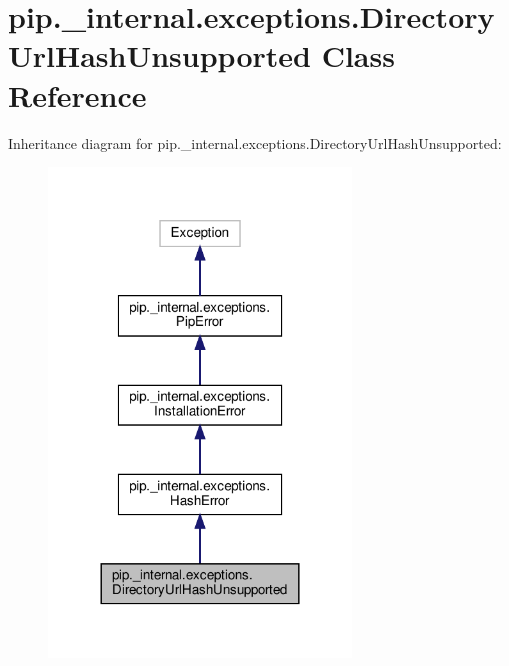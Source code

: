 \hypertarget{classpip_1_1__internal_1_1exceptions_1_1DirectoryUrlHashUnsupported}{}\section{pip.\+\_\+internal.\+exceptions.\+Directory\+Url\+Hash\+Unsupported Class Reference}
\label{classpip_1_1__internal_1_1exceptions_1_1DirectoryUrlHashUnsupported}


Inheritance diagram for pip.\+\_\+internal.\+exceptions.\+Directory\+Url\+Hash\+Unsupported\+:
\nopagebreak
\begin{figure}[H]
\begin{center}
\leavevmode
\includegraphics[width=228pt]{classpip_1_1__internal_1_1exceptions_1_1DirectoryUrlHashUnsupported__inherit__graph}
\end{center}
\end{figure}


